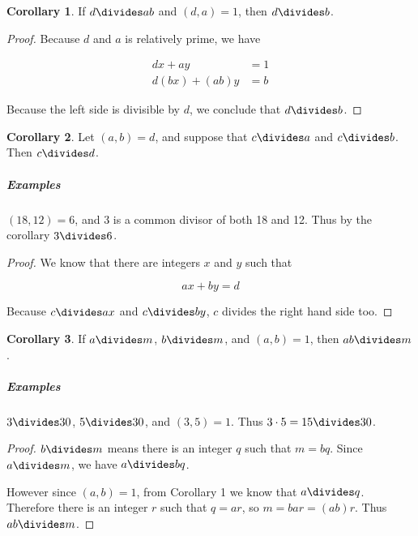 \documentclass{article}
\theoremstyle{definition} %
\theoremstyle{definition}
\newtheorem{corollary}{Corollary}[theorem] %
\theoremstyle{definition}
\theoremstyle{definition}
\begin{document}
  \begin{corollary}
    If $d \divides ab$ and $(d, a) = 1$, then $d \divides b$.
    \label{cor:must_divide_one_of_them}
  \end{corollary}
  
  \begin{proof}
    Because $d$ and $a$ is relatively prime, we have
    
    \begin{align*}
      dx + ay &= 1 \\
      d(bx) + (ab)y &= b
    \end{align*}
    
    Because the left side is divisible by $d$, we conclude that $d \divides b$.
  \end{proof}
  
  \begin{corollary}
    Let $(a, b) = d$, and suppose that $c \divides a$ and $c \divides b$.
    Then $c \divides d$.
  \end{corollary}
  
  \subparagraph{Examples} $(18, 12) = 6$, and 3 is a common divisor
  of both 18 and 12. Thus by the corollary $3 \divides 6$.
  
  \begin{proof}
    We know that there are integers $x$ and $y$ such that
    
    \begin{equation*}
      ax + by = d
    \end{equation*}
    
    Because $c \divides ax$ and $c \divides by$, $c$ divides the right hand side too.
  \end{proof}
  
  \begin{corollary}
    If $a \divides m$, $b \divides m$, and $(a, b) = 1$, then $ab \divides m$.
  \end{corollary}
  
  \subparagraph{Examples} $3 \divides 30$, $5 \divides 30$, and $(3, 5) = 1$. Thus $3 \cdot 5 = 15 \divides 30$.
  
  \begin{proof}
    $b \divides m$ means there is an integer $q$ such that $m = bq$.
    Since $a \divides m$, we have $a \divides bq$.
    
    However since $(a, b) = 1$, from Corollary 1 we know that $a \divides q$. Therefore
    there is an integer $r$ such that $q = ar$, so $m = bar = (ab) r$. Thus $ab \divides m$.
  \end{proof}
  
\end{document}
